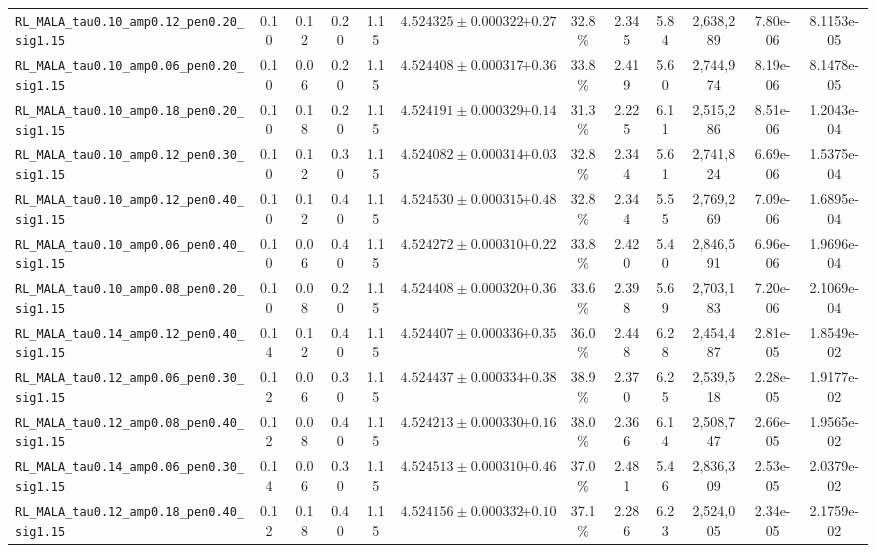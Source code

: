 \documentclass[10pt,a4paper]{article}
\begin{document}
\begin{table}[H]
\begin{adjustbox}{max width=\textwidth}
\begin{tabular}{lcccccccccccc}
\texttt{RL\_MALA\_tau0.10\_amp0.12\_pen0.20\_sig1.15} & 0.10 & 0.12 & 0.20 & 1.15 & $4.524325 \pm 0.000322$ & $+0.27$ & 32.8\% & 2.345 & 5.84 & 2,638,289 & 7.80e-06 & 8.1153e-05 \\
\texttt{RL\_MALA\_tau0.10\_amp0.06\_pen0.20\_sig1.15} & 0.10 & 0.06 & 0.20 & 1.15 & $4.524408 \pm 0.000317$ & $+0.36$ & 33.8\% & 2.419 & 5.60 & 2,744,974 & 8.19e-06 & 8.1478e-05 \\
\texttt{RL\_MALA\_tau0.10\_amp0.18\_pen0.20\_sig1.15} & 0.10 & 0.18 & 0.20 & 1.15 & $4.524191 \pm 0.000329$ & $+0.14$ & 31.3\% & 2.225 & 6.11 & 2,515,286 & 8.51e-06 & 1.2043e-04 \\
\texttt{RL\_MALA\_tau0.10\_amp0.12\_pen0.30\_sig1.15} & 0.10 & 0.12 & 0.30 & 1.15 & $4.524082 \pm 0.000314$ & $+0.03$ & 32.8\% & 2.344 & 5.61 & 2,741,824 & 6.69e-06 & 1.5375e-04 \\
\texttt{RL\_MALA\_tau0.10\_amp0.12\_pen0.40\_sig1.15} & 0.10 & 0.12 & 0.40 & 1.15 & $4.524530 \pm 0.000315$ & $+0.48$ & 32.8\% & 2.344 & 5.55 & 2,769,269 & 7.09e-06 & 1.6895e-04 \\
\texttt{RL\_MALA\_tau0.10\_amp0.06\_pen0.40\_sig1.15} & 0.10 & 0.06 & 0.40 & 1.15 & $4.524272 \pm 0.000310$ & $+0.22$ & 33.8\% & 2.420 & 5.40 & 2,846,591 & 6.96e-06 & 1.9696e-04 \\
\texttt{RL\_MALA\_tau0.10\_amp0.08\_pen0.20\_sig1.15} & 0.10 & 0.08 & 0.20 & 1.15 & $4.524408 \pm 0.000320$ & $+0.36$ & 33.6\% & 2.398 & 5.69 & 2,703,183 & 7.20e-06 & 2.1069e-04 \\
\texttt{RL\_MALA\_tau0.14\_amp0.12\_pen0.40\_sig1.15} & 0.14 & 0.12 & 0.40 & 1.15 & $4.524407 \pm 0.000336$ & $+0.35$ & 36.0\% & 2.448 & 6.28 & 2,454,487 & 2.81e-05 & 1.8549e-02 \\
\texttt{RL\_MALA\_tau0.12\_amp0.06\_pen0.30\_sig1.15} & 0.12 & 0.06 & 0.30 & 1.15 & $4.524437 \pm 0.000334$ & $+0.38$ & 38.9\% & 2.370 & 6.25 & 2,539,518 & 2.28e-05 & 1.9177e-02 \\
\texttt{RL\_MALA\_tau0.12\_amp0.08\_pen0.40\_sig1.15} & 0.12 & 0.08 & 0.40 & 1.15 & $4.524213 \pm 0.000330$ & $+0.16$ & 38.0\% & 2.366 & 6.14 & 2,508,747 & 2.66e-05 & 1.9565e-02 \\
\texttt{RL\_MALA\_tau0.14\_amp0.06\_pen0.30\_sig1.15} & 0.14 & 0.06 & 0.30 & 1.15 & $4.524513 \pm 0.000310$ & $+0.46$ & 37.0\% & 2.481 & 5.46 & 2,836,309 & 2.53e-05 & 2.0379e-02 \\
\texttt{RL\_MALA\_tau0.12\_amp0.18\_pen0.40\_sig1.15} & 0.12 & 0.18 & 0.40 & 1.15 & $4.524156 \pm 0.000332$ & $+0.10$ & 37.1\% & 2.286 & 6.23 & 2,524,005 & 2.34e-05 & 2.1759e-02 \\

\end{tabular}
\end{adjustbox}
\end{table}
\end{document}
